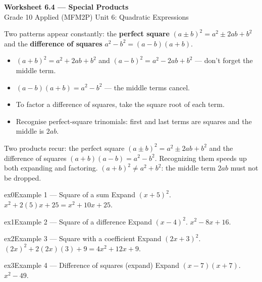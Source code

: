 \documentclass[11pt]{article}
\begin{document}
\begin{center}
{\LARGE\bfseries\color{titleblue}Worksheet 6.4 --- Special Products}\\[2pt]
{\small Grade 10 Applied (MFM2P) \textperiodcentered{} Unit 6: Quadratic Expressions}
\end{center}

\begin{ideabox}
Two patterns appear constantly: the \textbf{perfect square} $(a\pm b)^2=a^2\pm2ab+b^2$ and the \textbf{difference of squares} $a^2-b^2=(a-b)(a+b)$.
\begin{itemize}[leftmargin=*,itemsep=2pt]
  \item $(a+b)^2=a^2+2ab+b^2$ and $(a-b)^2=a^2-2ab+b^2$ --- don't forget the middle term.
  \item $(a-b)(a+b)=a^2-b^2$ --- the middle terms cancel.
  \item To factor a difference of squares, take the square root of each term.
  \item Recognise perfect-square trinomials: first and last terms are squares and the middle is $2ab$.
\end{itemize}
\end{ideabox}

\begin{learnbox}
Two products recur: the perfect square $(a\pm b)^2=a^2\pm2ab+b^2$ and the difference of squares $(a+b)(a-b)=a^2-b^2$.
Recognizing them speeds up both expanding and factoring.
$(a+b)^2\ne a^2+b^2$: the middle term $2ab$ must not be dropped.
\end{learnbox}


\begin{example}{ex0}{Example 1 --- Square of a sum}
Expand $(x+5)^2$.
\soln $x^2+2(5)x+25=x^2+10x+25.$
\end{example}

\begin{example}{ex1}{Example 2 --- Square of a difference}
Expand $(x-4)^2$.
\soln $x^2-8x+16.$
\end{example}

\begin{example}{ex2}{Example 3 --- Square with a coefficient}
Expand $(2x+3)^2$.
\soln $(2x)^2+2(2x)(3)+9=4x^2+12x+9.$
\end{example}

\begin{example}{ex3}{Example 4 --- Difference of squares (expand)}
Expand $(x-7)(x+7)$.
\soln $x^2-49.$
\end{example}
\end{document}
